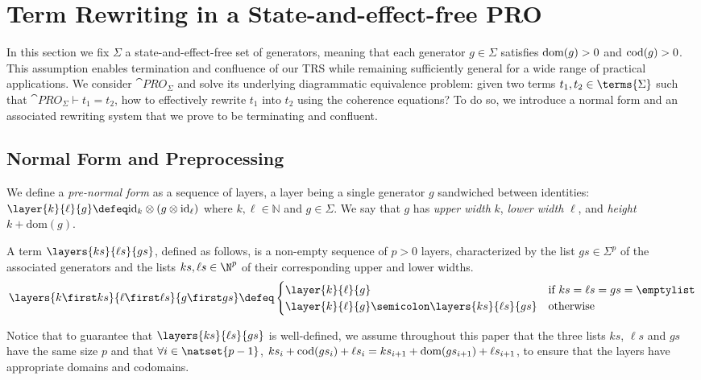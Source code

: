 
\section{Term Rewriting in a State-and-effect-free PRO}\label{sec:pro}

In this section we fix $\Sigma$ a state-and-effect-free set of generators, meaning that each generator $g\in\Sigma$ satisfies $\textup{dom}(g)>0$ and $\textup{cod}(g)>0$. This assumption enables termination and confluence of our TRS while remaining sufficiently general for a wide range of practical applications. We consider $\cat{PRO}_\Sigma$ and solve its underlying diagrammatic equivalence problem: given two terms $t_1,t_2\in\terms{\Sigma}$ such that $\cat{PRO}_\Sigma\vdash t_1=t_2$, how to effectively rewrite $t_1$ into $t_2$ using the coherence equations? To do so, we introduce a normal form and an associated rewriting system that we prove to be terminating and confluent.


\subsection{Normal Form and Preprocessing}

We define a \emph{pre-normal form} as a sequence of layers, a layer being a single generator $g$ sandwiched between identities: $\layer{k}{\ell}{g} \defeq \textup{id}_{k}\otimes (g\otimes\textup{id}_{\ell})$ where $k,\ell\in \mathbb N$ and $g\in \Sigma$. We say that $g$ has  \emph{upper width}  $k$, \emph{lower width} $\ell$, and \emph{height} $k+\text{dom}(g)$. 

A term $\layers{ks}{\ell s}{gs}$, defined as follows, is a non-empty sequence of $p>0$ layers, characterized by the list $gs\in\Sigma^p$  of the associated generators and the lists $ks,\ell s\in\N^p$ of their corresponding upper  and lower widths. 
\begin{gather*}
    \layers{k\first ks}{\ell\first \ell s}{g\first gs} \defeq \begin{cases} 
        \layer{k}{\ell}{g} &\text{if $ks=\ell s=gs = \emptylist$}\\
        \layer{k}{\ell}{g}\semicolon \layers{ks}{\ell s}{gs} &\text{otherwise}
    \end{cases}
\end{gather*}

Notice that to guarantee that $\layers{ks}{\ell s}{gs}$ is well-defined, we assume throughout this paper that the three lists $ks$, $\ell s$ and $gs$ have the same size $p$ and that $\forall i\in \natset{p-1}$, $ks_i+\textup{cod}(gs_i) + \ell s_i = ks_{i+1}+\textup{dom}(gs_{i+1}) + \ell s_{i+1}$, to ensure that the layers have appropriate domains and codomains. 

